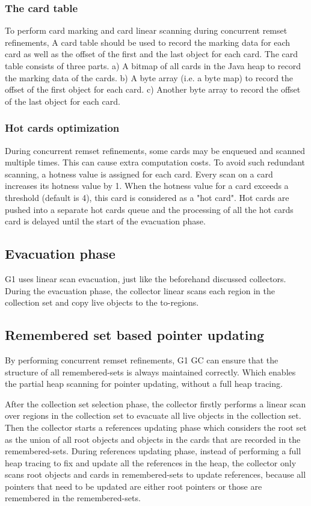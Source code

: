 \subsubsection{The card table}

To perform card marking and card linear scanning during concurrent remset refinements,
A card table should be used to record the marking data for each card as well as the offset
of the first and the last object for each card.
The card table consists of three parts. a) A bitmap of all cards in the Java heap
to record the marking data of the cards. b) A byte array (i.e. a byte map) to record the
offset of the first object for each card. c) Another byte array to record the
offset of the last object for each card.

\subsubsection{Hot cards optimization}

During concurrent remset refinements, some cards may be enqueued and scanned multiple times.
This can cause extra computation costs. To avoid such redundant scanning,
a hotness value is assigned for each card. Every scan on a card increases its hotness value by 1.
When the hotness value for a card exceeds a threshold (default is 4), this card is considered
as a "hot card". Hot cards are pushed into a separate hot cards queue and the processing
of all the hot cards card is delayed until the start of the evacuation phase.

\subsection{Evacuation phase}

G1 uses linear scan evacuation, just like the beforehand discussed collectors.
During the evacuation phase, the collector linear scans each region in the collection
set and copy live objects to the to-regions.

\subsection{Remembered set based pointer updating}

By performing concurrent remset refinements, G1 GC can ensure that the structure of all remembered-sets is always maintained correctly.
Which enables the partial heap scanning for pointer updating, without a full heap tracing.

After the collection set selection phase, the collector firstly performs a linear
scan over regions in the collection set to evacuate all live objects in the collection set.
Then the collector starts a references updating phase which considers
the root set as the union of all root objects and objects in the cards that are recorded in the remembered-sets.
During references updating phase, instead of performing a full heap tracing to fix and
update all the references in the heap, the collector only scans root objects and
cards in remembered-sets to update references,
because all pointers that need to be updated are either root pointers or those are remembered in the remembered-sets.

